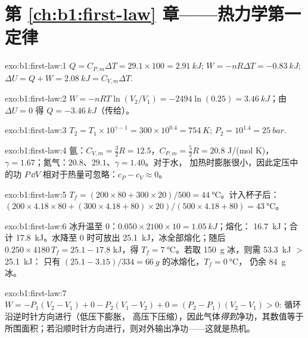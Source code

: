 \section*{第 \ref{ch:b1:first-law} 章——热力学第一定律}

\begin{solution}{exo:b1:first-law:1}
$Q = C_{P,m}\Delta T = 29.1 \times 100 = \qty{2.91}{kJ}$; $W = -nR\Delta T =
\qty{-0.83}{kJ}$; $\Delta U = Q + W = \qty{2.08}{kJ} = C_{V,m}\Delta T$.
\end{solution}

\begin{solution}{exo:b1:first-law:2}
$W = -nRT\ln(V_2/V_1) = -2494\ln(0.25) = \qty{+3.46}{kJ}$；由 $\Delta U = 0$ 得
$Q = \qty{-3.46}{kJ}$（传给）。
\end{solution}

\begin{solution}{exo:b1:first-law:3}
$T_2 = T_1 \times 10^{\gamma - 1} = 300 \times 10^{0.4} = \qty{754}{K}$; $P_2 =
10^{1.4} = \qty{25}{bar}$.
\end{solution}

\begin{solution}{exo:b1:first-law:4}
氩：$C_{V,m} = \tfrac32 R = 12.5$，$C_{P,m} = \tfrac52 R = 20.8$ J/(mol K)，
$\gamma = 1.67$；氮气：$20.8$、$29.1$、$\gamma = 1.40$。对于水，
加热时膨胀很小，因此定压中的功 $P\,\dd V$
相对于热量可忽略：$c_P - c_V \approx 0$。
\end{solution}

\begin{solution}{exo:b1:first-law:5}
$T_f = (200 \times 80 + 300 \times 20)/500 = \qty{44}{\degreeCelsius}$。计入杯子后：
$(200 \times 4.18 \times 80 + (300 \times 4.18 + 80) \times 20)/(500 \times
4.18 + 80) = \qty{43}{\degreeCelsius}$。
\end{solution}

\begin{solution}{exo:b1:first-law:6}
冰升温至 $0$：$0.050 \times 2100 \times 10 = \qty{1.05}{kJ}$；熔化：
\qty{16.7}{kJ}；合计 \qty{17.8}{kJ}。水降至
$0$ 时可放出 \qty{25.1}{kJ}，冰全部熔化；随后 $0.250 \times 4180\,T_f = 25.1 - 17.8$ kJ，得 $T_f =
\qty{7}{\degreeCelsius}$。若取 \qty{150}{g} 冰，则需 \qty{53.3}{kJ} $>$ \qty{25.1}{kJ}：
只有 $(25.1 - 3.15)/334 = \qty{66}{g}$ 的冰熔化，$T_f = \qty{0}{\degreeCelsius}$，
仍余 \qty{84}{g} 冰。
\end{solution}

\begin{solution}{exo:b1:first-law:7}
$W = -P_1(V_2 - V_1) + 0 - P_2(V_1 - V_2) + 0 = (P_2 - P_1)(V_2 - V_1) > 0$:
循环沿逆时针方向进行（低压下膨胀，
高压下压缩），因此气体\emph{得到}净功，其数值等于
所围面积；若沿顺时针方向进行，则对外输出净功——这就是热机。
\end{solution}

